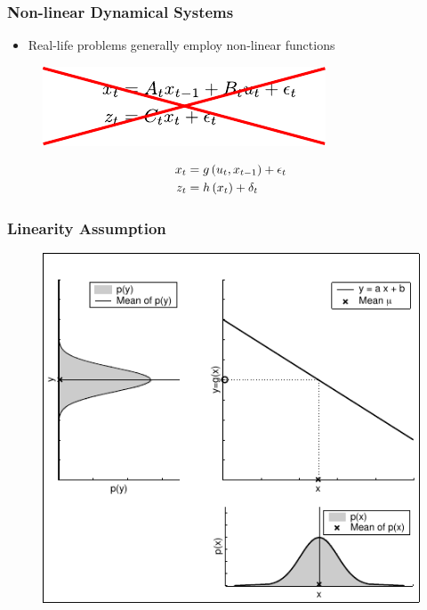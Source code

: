 \begin{frame}
    \frametitle{Non-linear Dynamical Systems}
    \begin{itemize}
        \item Real-life problems generally employ non-linear functions
    \end{itemize}
    
    
    \begin{figure}[!h] 
        \includegraphics[width=0.4\columnwidth]{./images/kalman_filter_linear_equations_cross_out.pdf}
    \end{figure}
    
    \begin{align*}
    x_{t} &= g\left( u_{t}, x_{t-1} \right) + \epsilon_{t}\\
    z_{t} &= h\left( x_{t} \right) + \delta_{t}
    \end{align*}
    
\end{frame}
    
\begin{frame}
    \frametitle{Linearity Assumption}

    \begin{figure}[!h]
        \includegraphics[width=0.5\columnwidth]{./images/linear_transformation_of_a_gaussian.pdf}
    \end{figure}
\end{frame}
    
